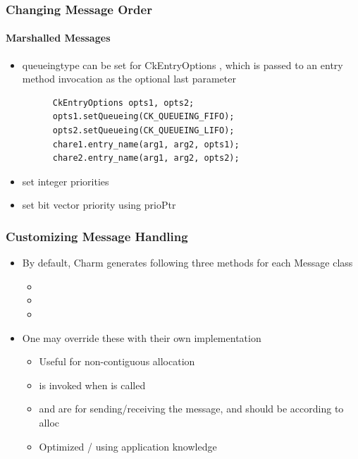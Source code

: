 \begin{frame}[fragile]
  \frametitle{Changing Message Order}
  \framesubtitle{Marshalled Messages}
  \begin{itemize}
    \item queueingtype can be set for CkEntryOptions , which is passed to an entry method invocation as the optional last parameter
    \begin{lstlisting}
      CkEntryOptions opts1, opts2;
      opts1.setQueueing(CK_QUEUEING_FIFO);
      opts2.setQueueing(CK_QUEUEING_LIFO);
      chare1.entry_name(arg1, arg2, opts1);
      chare2.entry_name(arg1, arg2, opts2);
    \end{lstlisting}
    \item {} set integer priorities
    \item {}  set bit vector priority using prioPtr
  \end{itemize}
\end{frame}

\begin{frame}[fragile]
  \frametitle{Customizing Message Handling}
  \begin{itemize}
    \item By default, Charm generates following three methods for each Message class
    \begin{itemize}
      \item {}
      \item {}
      \item {}
    \end{itemize}
   \item One may override these with their own implementation
   \begin{itemize}
     \item Useful for non-contiguous allocation
     \item {} is invoked when  is called
     \item {} and  are for sending/receiving the message, and should be according to alloc
     \item Optimized / using application knowledge
   \end{itemize}
  \end{itemize}
\end{frame}

